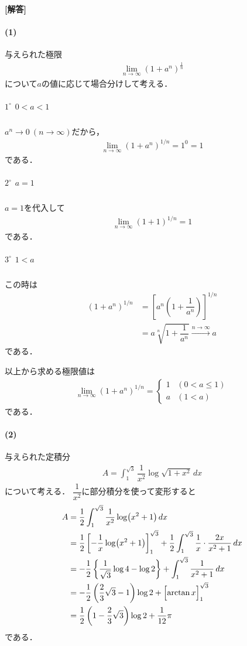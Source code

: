 \documentclass[../../main.tex]{subfiles}
\begin{document}
\begin{oframed}
  
\end{oframed}

{\bf [解答]}

\paragraph{(1)}

与えられた極限
\begin{align}
  \lim_{n \to \infty}{(1+a^n)}^{\frac{1}{n}}
\end{align}
について$a$の値に応じて場合分けして考える．

\subparagraph{$1^\circ$ $0<a<1$}

$a^n\to0\ (n\to\infty)$だから，
\begin{align}
  \lim_{n\to\infty} (1+a^n)^{1/n} = 1^0 = 1
\end{align}
である．

\subparagraph{$2^\circ$ $a=1$}

$a=1$を代入して
\begin{align}
  \lim_{n\to\infty}(1+1)^{1/n} = 1
\end{align}
である．

\subparagraph{$3^\circ$ $1<a$}

この時は
\begin{align}
  (1+a^n)^{1/n}
  &=\left[a^n\left(1+\dfrac{1}{a^n}\right)\right]^{1/n}\\
  &=a\sqrt[n]{1+\dfrac{1}{a^n}}\xrightarrow{n\to\infty} a
\end{align}
である．
\casesend

以上から求める極限値は
\begin{align}
  \lim_{n\to\infty}(1+a^n)^{1/n}=
  \begin{cases}1&(0<a\le1)\\a&(1<a)
  \end{cases}
\end{align}
である．

\paragraph{(2)}

与えられた定積分
\begin{align}
  A=\int_1^{\sqrt{3}}\dfrac{1}{x^2}\log\sqrt{1+x^2}\,dx \label{eq:1}
\end{align}
について考える．
$\dfrac{1}{x^2}$に部分積分を使って変形すると
\begin{align}
  A
  &=\dfrac{1}{2}\int_1^{\sqrt{3}}\dfrac{1}{x^2}\log(x^2+1)\,dx\\
  &=\dfrac{1}{2}\left[-\dfrac{1}{x}\log(x^2+1)\right]_1^{\sqrt{3}}+\dfrac{1}{2}\int_1^{\sqrt{3}}\dfrac{1}{x}\cdot\dfrac{2x}{x^2+1}\,dx\\
  &=-\dfrac{1}{2}\left\{\dfrac{1}{\sqrt{3}}\log4-\log2\right\}+\int_1^{\sqrt{3}}\dfrac{1}{x^2+1}\,dx\\
  &=-\dfrac{1}{2}\left(\dfrac{2}{3}\sqrt{3}-1\right)\log2+\Bigl[\arctan x\Bigr]_1^{\sqrt{3}}\\
  &=\dfrac{1}{2}\left(1-\dfrac{2}{3}\sqrt{3}\right)\log2+\dfrac{1}{12}\pi
\end{align}
である．
\end{document}
